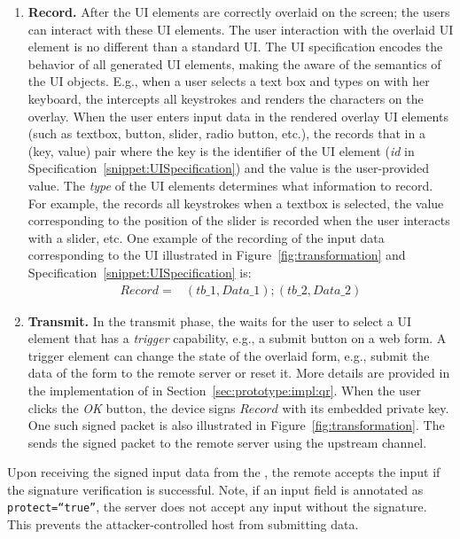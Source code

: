 \begin{enumerate}
\item \textbf{Record.} After the UI elements are correctly overlaid on the screen; the users can interact with these UI elements. The user interaction with the overlaid UI element is no different than a standard UI. The UI specification encodes the behavior of all generated UI elements, making the \device aware of the semantics of the UI objects. E.g., when a user selects a text box and types on with her keyboard, the \device intercepts all keystrokes and renders the characters on the overlay.
When the user enters input data in the rendered overlay UI elements (such as textbox, button, slider, radio button, etc.), the \device records that in a (key, value) pair where the key is the identifier of the UI element (\emph{id} in Specification~\ref{snippet:UISpecification}) and the value is the user-provided value. The \emph{type} of the UI elements determines what information to record. For example, the \device records all keystrokes when a textbox is selected, the value corresponding to the position of the slider is recorded when the user interacts with a slider, etc. One example of the recording of the input data corresponding to the UI illustrated in Figure~\ref{fig:transformation} and Specification~\ref{snippet:UISpecification} is: 
\begin{align*}
Record = & (tb\_1, Data\_1);(tb\_2,Data\_2)
\end{align*}

\item \textbf{Transmit.} In the transmit phase, the \device waits for the user to select a UI element that has a \emph{trigger} capability, e.g., a submit button on a web form. A trigger element can change the state of the overlaid form, e.g., submit the data of the form to the remote server or reset it. More details are provided in the implementation of \name in Section~\ref{sec:prototype:impl:qr}. When the user clicks the \emph{OK} button, the device signs $Record$ with its embedded private key. One such signed packet is also illustrated in Figure~\ref{fig:transformation}. The \device sends the signed packet to the remote server using the upstream channel.
\end{enumerate} 

Upon receiving the signed input data from the \device, the remote accepts the input if the signature verification is successful. Note, if an input field is annotated as \texttt{protect=``true''}, the server does not accept any input without the \device signature. This prevents the attacker-controlled host from submitting data. 


